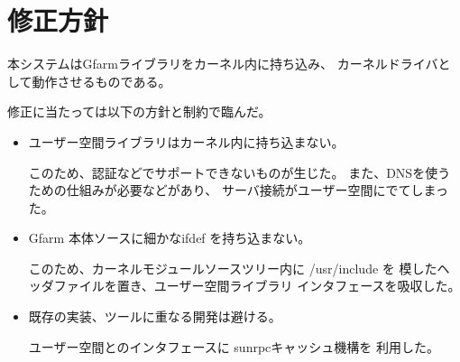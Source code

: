 \section{修正方針}
	本システムはGfarmライブラリをカーネル内に持ち込み、
	カーネルドライバとして動作させるものである。

	修正に当たっては以下の方針と制約で臨んだ。
	\begin{itemize}
	\item	ユーザー空間ライブラリはカーネル内に持ち込まない。

		このため、認証などでサポートできないものが生じた。
		また、DNSを使うための仕組みが必要などがあり、
		サーバ接続がユーザー空間にでてしまった。

	\item	Gfarm 本体ソースに細かなifdef を持ち込まない。

		このため、カーネルモジュールソースツリー内に /usr/include を
		模したヘッダファイルを置き、ユーザー空間ライブラリ
		インタフェースを吸収した。

	\item	既存の実装、ツールに重なる開発は避ける。

		ユーザー空間とのインタフェースに sunrpcキャッシュ機構を
		利用した。
	\end{itemize}
